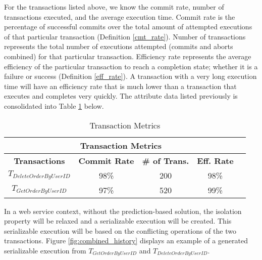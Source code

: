 For the transactions listed above, we know the commit rate, number of transactions executed, and the average execution time. Commit rate is the percentage of successful commits over the total amount of attempted executions of that particular transaction (Definition \ref{cmt_rate}). Number of transactions represents the total number of executions attempted (commits and aborts combined) for that particular transaction. Efficiency rate represents the average efficiency of the particular transaction to reach a completion state; whether it is a failure or success (Definition \ref{eff_rate}). A transaction with a very long execution time will have an efficiency rate that is much lower than a transaction that executes and completes very quickly. The attribute data listed previously is consolidated into Table \ref{tbl:trans_metrics} below. 
\\
\begin{table}[h]
\caption{Transaction Metrics} %
\captionsetup{justification=centering}
\centering
\begin{tabular}{|c|c|c|c|c|}
\hline
\multicolumn{4}{|c|}{\cellcolor[HTML]{EFEFEF}\textbf{Transaction Metrics}}                                                   \\ \hline
\textbf{Transactions} & \textbf{Commit Rate} & \textbf{\# of Trans.} & {\color[HTML]{000000} \textbf{Eff. Rate}} \\ \hline
$T_{DeleteOrderByUserID}$         & 98\%                  & 200                         & 98\%                                          \\ \hline
$T_{GetOrderByUserID}$          & 97\%                     & 520                           & 99\%                                              \\ \hline
\end{tabular}
\label{tbl:trans_metrics} %

\end{table}

In a web service context, without the prediction-based solution, the isolation property will be relaxed and a serializable execution will be created. This serializable execution will be based on the conflicting operations of the two transactions. Figure \ref{fig:combined_history} displays an example of a generated serializable execution from $T_{GetOrderByUserID}$ and $T_{DeleteOrderByUserID}$.

